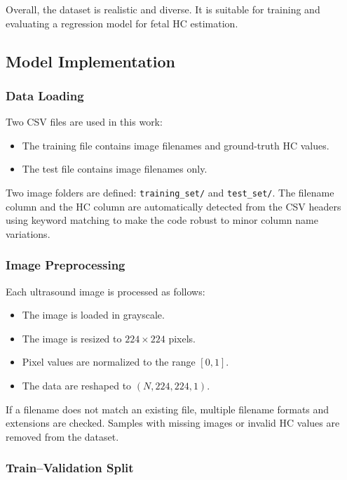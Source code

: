 \documentclass[conference]{IEEEtran}
\begin{document}
Overall, the dataset is realistic and diverse. It is suitable for training and evaluating a regression model for fetal HC estimation.



\subsection{Model Implementation}

\subsubsection{Data Loading}

Two CSV files are used in this work:
\begin{itemize}
    \item The training file contains image filenames and ground-truth HC values.
    \item The test file contains image filenames only.
\end{itemize}

Two image folders are defined: \texttt{training\_set/} and \texttt{test\_set/}. The filename column and the HC column are automatically detected from the CSV headers using keyword matching to make the code robust to minor column name variations.

\subsubsection{Image Preprocessing}

Each ultrasound image is processed as follows:
\begin{itemize}
    \item The image is loaded in grayscale.
    \item The image is resized to $224 \times 224$ pixels.
    \item Pixel values are normalized to the range $[0,1]$.
    \item The data are reshaped to $(N, 224, 224, 1)$.
\end{itemize}

If a filename does not match an existing file, multiple filename formats and extensions are checked. Samples with missing images or invalid HC values are removed from the dataset.

\subsubsection{Train--Validation Split}
\end{document}
